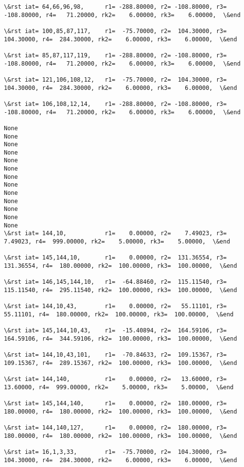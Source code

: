 \documentclass[11pt]{article}
\begin{document}
\begin{Verbatim}[commandchars=\\\{\}]
\&rst iat= 64,66,96,98,      r1= -288.80000, r2= -108.80000, r3= -108.80000, r4=   71.20000, rk2=    6.00000, rk3=    6.00000,  \&end

\&rst iat= 100,85,87,117,    r1=  -75.70000, r2=  104.30000, r3=  104.30000, r4=  284.30000, rk2=    6.00000, rk3=    6.00000,  \&end

\&rst iat= 85,87,117,119,    r1= -288.80000, r2= -108.80000, r3= -108.80000, r4=   71.20000, rk2=    6.00000, rk3=    6.00000,  \&end

\&rst iat= 121,106,108,12,   r1=  -75.70000, r2=  104.30000, r3=  104.30000, r4=  284.30000, rk2=    6.00000, rk3=    6.00000,  \&end

\&rst iat= 106,108,12,14,    r1= -288.80000, r2= -108.80000, r3= -108.80000, r4=   71.20000, rk2=    6.00000, rk3=    6.00000,  \&end

None
None
None
None
None
None
None
None
None
None
None
None
None
\&rst iat= 144,10,           r1=    0.00000, r2=    7.49023, r3=    7.49023, r4=  999.00000, rk2=    5.00000, rk3=    5.00000,  \&end

\&rst iat= 145,144,10,       r1=    0.00000, r2=  131.36554, r3=  131.36554, r4=  180.00000, rk2=  100.00000, rk3=  100.00000,  \&end

\&rst iat= 146,145,144,10,   r1=  -64.88460, r2=  115.11540, r3=  115.11540, r4=  295.11540, rk2=  100.00000, rk3=  100.00000,  \&end

\&rst iat= 144,10,43,        r1=    0.00000, r2=   55.11101, r3=   55.11101, r4=  180.00000, rk2=  100.00000, rk3=  100.00000,  \&end

\&rst iat= 145,144,10,43,    r1=  -15.40894, r2=  164.59106, r3=  164.59106, r4=  344.59106, rk2=  100.00000, rk3=  100.00000,  \&end

\&rst iat= 144,10,43,101,    r1=  -70.84633, r2=  109.15367, r3=  109.15367, r4=  289.15367, rk2=  100.00000, rk3=  100.00000,  \&end

\&rst iat= 144,140,          r1=    0.00000, r2=   13.60000, r3=   13.60000, r4=  999.00000, rk2=    5.00000, rk3=    5.00000,  \&end

\&rst iat= 145,144,140,      r1=    0.00000, r2=  180.00000, r3=  180.00000, r4=  180.00000, rk2=  100.00000, rk3=  100.00000,  \&end

\&rst iat= 144,140,127,      r1=    0.00000, r2=  180.00000, r3=  180.00000, r4=  180.00000, rk2=  100.00000, rk3=  100.00000,  \&end

\&rst iat= 16,1,3,33,        r1=  -75.70000, r2=  104.30000, r3=  104.30000, r4=  284.30000, rk2=    6.00000, rk3=    6.00000,  \&end


\end{Verbatim}
\end{document}
